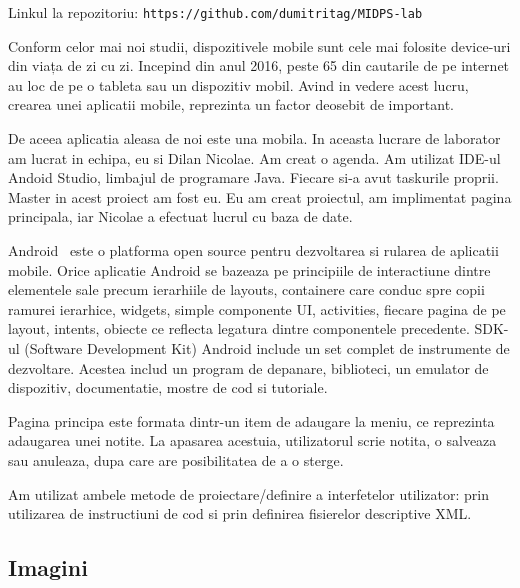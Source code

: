 Linkul la repozitoriu: \texttt{https://github.com/dumitritag/MIDPS-lab}


Conform celor mai noi studii, dispozitivele mobile sunt cele mai folosite device-uri din viața de zi cu zi. Incepind din anul 2016, peste 65 din cautarile de pe internet au loc de pe o tableta sau un dispozitiv mobil. Avind in vedere acest lucru, crearea unei aplicatii mobile, reprezinta un factor deosebit de important.

De aceea aplicatia aleasa de noi este una mobila. In aceasta lucrare de laborator am lucrat in echipa, eu si Dilan Nicolae. Am creat o agenda. Am utilizat IDE-ul Andoid Studio, limbajul de programare Java. Fiecare si-a avut taskurile proprii. Master in acest proiect am fost eu. Eu am creat proiectul, am implimentat pagina principala, iar Nicolae a efectuat lucrul cu baza de date.

 Android  este o platforma open source pentru dezvoltarea si rularea de aplicatii mobile. Orice aplicatie Android se bazeaza pe principiile de interactiune dintre elementele sale precum ierarhiile de layouts, containere care conduc spre copii ramurei ierarhice, widgets, simple componente UI, activities, fiecare pagina de pe layout, intents, obiecte ce reflecta legatura dintre componentele precedente. SDK-ul (Software Development Kit) Android include un set complet de instrumente de dezvoltare. Acestea includ un program de depanare, biblioteci, un emulator de dispozitiv, documentatie, mostre de cod si tutoriale. 

Pagina principa este formata dintr-un item de adaugare la meniu, ce reprezinta adaugarea unei notite. La apasarea acestuia, utilizatorul scrie notita, o salveaza sau anuleaza, dupa care are posibilitatea de a o sterge.

Am utilizat ambele metode de proiectare/definire a interfetelor utilizator: prin utilizarea de instructiuni de cod si prin definirea fisierelor descriptive XML.


  

\subsection{Imagini}




